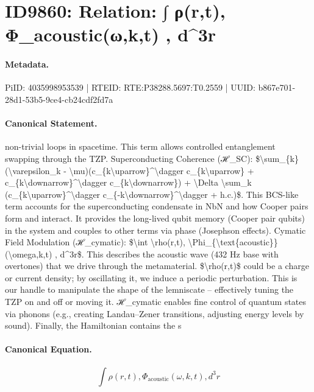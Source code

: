 \section*{ID9860: Relation: ∫ ρ(r,t), Φ\_acoustic(ω,k,t) , d\textasciicircum{}3r}
\paragraph{Metadata.}
PiID: 4035998953539 | RTEID: RTE:P38288.5697:T0.2559 | UUID: b867e701-28d1-53b5-9ce4-cb24cdf2fd7a

\paragraph{Canonical Statement.}
non-trivial loops in spacetime. This term allows controlled entanglement swapping through the TZP. Superconducting Coherence (ℋ\_SC): \$\textbackslash{}sum\_\{k\} (\textbackslash{}varepsilon\_k - \textbackslash{}mu)(c\_\{k\textbackslash{}uparrow\}\textasciicircum{}\textbackslash{}dagger c\_\{k\textbackslash{}uparrow\} + c\_\{k\textbackslash{}downarrow\}\textasciicircum{}\textbackslash{}dagger c\_\{k\textbackslash{}downarrow\}) + \textbackslash{}Delta \textbackslash{}sum\_k (c\_\{k\textbackslash{}uparrow\}\textasciicircum{}\textbackslash{}dagger c\_\{-k\textbackslash{}downarrow\}\textasciicircum{}\textbackslash{}dagger + h.c.)\$. This BCS-like term accounts for the superconducting condensate in NbN and how Cooper pairs form and interact. It provides the long-lived qubit memory (Cooper pair qubits) in the system and couples to other terms via phase (Josephson effects). Cymatic Field Modulation (ℋ\_cymatic): \$\textbackslash{}int \textbackslash{}rho(r,t), \textbackslash{}Phi\_\{\textbackslash{}text\{acoustic\}\}(\textbackslash{}omega,k,t) , d\textasciicircum{}3r\$. This describes the acoustic wave (432 Hz base with overtones) that we drive through the metamaterial. \$\textbackslash{}rho(r,t)\$ could be a charge or current density; by oscillating it, we induce a periodic perturbation. This is our handle to manipulate the shape of the lemniscate – effectively tuning the TZP on and off or moving it. ℋ\_cymatic enables fine control of quantum states via phonons (e.g., creating Landau–Zener transitions, adjusting energy levels by sound). Finally, the Hamiltonian contains the s

\paragraph{Canonical Equation.}
\[
\int \rho(r,t), \Phi_{\text{acoustic}}(\omega,k,t) , d^3r
\]

